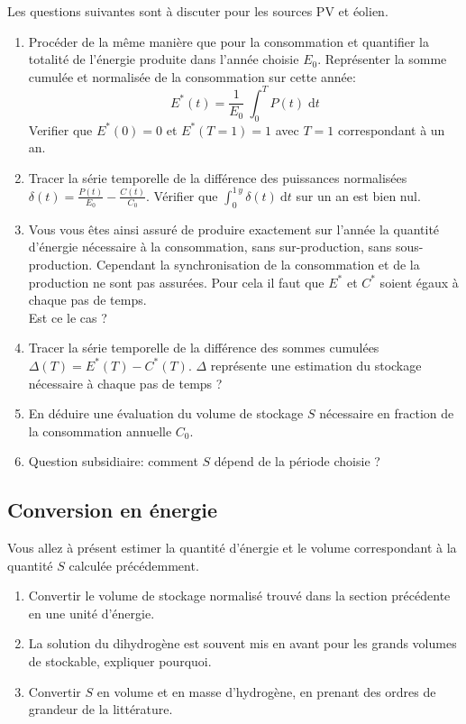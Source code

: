 \documentclass[12pt,a4,french]{article}
\begin{document}
Les questions suivantes sont à discuter pour les sources PV et éolien.
\begin{enumerate}
	\item Procéder de la même manière que pour la consommation et quantifier la totalité de l'énergie produite dans l'année choisie $E_0$. Représenter la somme cumulée et normalisée de la consommation sur cette année: 
	\begin{equation}
		E^*(t)  = \frac{1}{E_0} ~ \int_{0}^{T} P(t) \; \text{d} t	
	\end{equation}
	Verifier que $E^*(0)=0$ et $E^*(T=1)=1$ avec $T=1$ correspondant à un an. 
	
	\item Tracer la série temporelle de la différence des puissances normalisées $\delta(t) = \frac{P(t)}{E_0} - \frac{C(t)}{C_0}$. Vérifier que $\int_0^{1\,y} \delta(t) ~ \text{d} t $ sur un an est bien nul.
	
	\item Vous vous êtes ainsi assuré de produire exactement sur l'année la quantité d'énergie nécessaire à la consommation, sans sur-production, sans sous-production. Cependant la synchronisation de la consommation et de la production ne sont pas assurées. Pour cela il faut que $E^*$ et $C^*$ soient égaux à chaque pas de temps.\\ Est ce le cas ? 
	
	\item Tracer la série temporelle de la différence des sommes cumulées $\Delta(T) = E^*(T) - C^*(T)$. $\Delta $ représente une estimation du stockage nécessaire à chaque pas de temps ?
	
	\item En déduire une évaluation du volume de stockage $S$ nécessaire en fraction de la consommation annuelle $C_0$.
	
	\item Question subsidiaire: comment $S$ dépend de la période choisie ?
	
\end{enumerate}

\subsection{Conversion en énergie}

Vous allez à présent estimer la quantité d'énergie et le volume correspondant à la quantité $S$ calculée précédemment. 

\begin{enumerate}
	\item Convertir le volume de stockage normalisé trouvé dans la section précédente en une unité d'énergie.
	\item La solution du dihydrogène est souvent mis en avant pour les grands volumes de stockable, expliquer pourquoi.
	\item Convertir $S$ en volume et en masse d'hydrogène, en prenant des ordres de grandeur de la littérature.
\end{enumerate}
\end{document}
